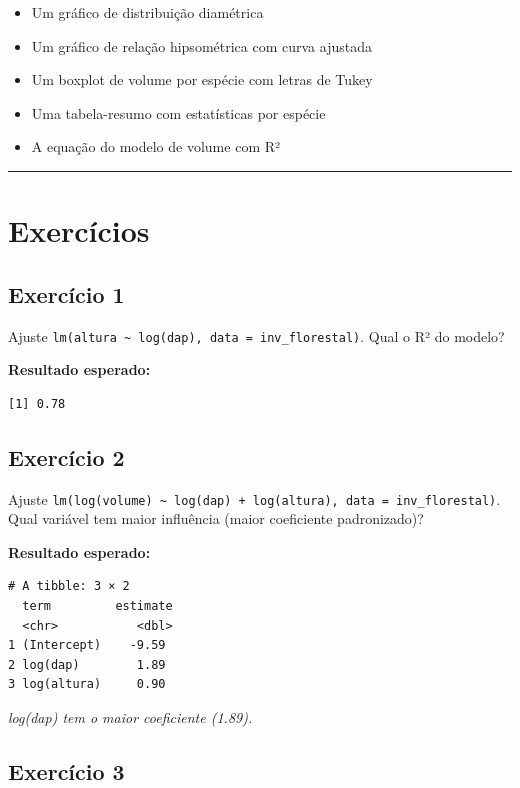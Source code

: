 \documentclass[
  letterpaper,
]{scrbook}
\providecommand{\tightlist}{%
  \setlength{\itemsep}{0pt}\setlength{\parskip}{0pt}}
\begin{document}
\begin{itemize}
\tightlist
\item
  Um gráfico de distribuição diamétrica
\item
  Um gráfico de relação hipsométrica com curva ajustada
\item
  Um boxplot de volume por espécie com letras de Tukey
\item
  Uma tabela-resumo com estatísticas por espécie
\item
  A equação do modelo de volume com R²
\end{itemize}

\begin{center}\rule{0.5\linewidth}{0.5pt}\end{center}

\section{Exercícios}\label{exercuxedcios-15}

\subsection{Exercício 1}\label{exercuxedcio-1-14}

Ajuste
\texttt{lm(altura\ \textasciitilde{}\ log(dap),\ data\ =\ inv\_florestal)}.
Qual o R² do modelo?

\textbf{Resultado esperado:}

\begin{verbatim}
[1] 0.78
\end{verbatim}

\subsection{Exercício 2}\label{exercuxedcio-2-14}

Ajuste
\texttt{lm(log(volume)\ \textasciitilde{}\ log(dap)\ +\ log(altura),\ data\ =\ inv\_florestal)}.
Qual variável tem maior influência (maior coeficiente padronizado)?

\textbf{Resultado esperado:}

\begin{verbatim}
# A tibble: 3 × 2
  term         estimate
  <chr>           <dbl>
1 (Intercept)    -9.59 
2 log(dap)        1.89 
3 log(altura)     0.90
\end{verbatim}

\emph{log(dap) tem o maior coeficiente (1.89).}

\subsection{Exercício 3}\label{exercuxedcio-3-13}
\end{document}
